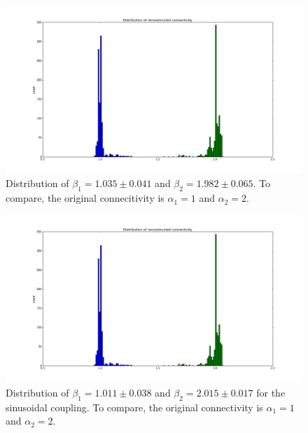 \documentclass[11pt,a4paper]{article}
\begin{document}
\begin{figure}
    \centering
    \includegraphics[scale=0.42]{2linear}
    \caption{Distribution of $\beta_1=1.035 \pm 0.041$ and $\beta_2=1.982 \pm 0.065$. To compare, the original connecitivity is $\alpha_1=1$ and $\alpha_2=2$.}
    \label{fig:5}
\end{figure}

\begin{figure}
    \centering
    \includegraphics[scale=0.42]{2linear}
    \caption{Distribution of $\beta_1=1.011 \pm 0.038$ and $\beta_2=2.015 \pm 0.017$ for the sinusoidal coupling. To compare, the original connectivity is $\alpha_1=1$ and $\alpha_2=2$.}
    \label{fig:6}
\end{figure}
\end{document}
